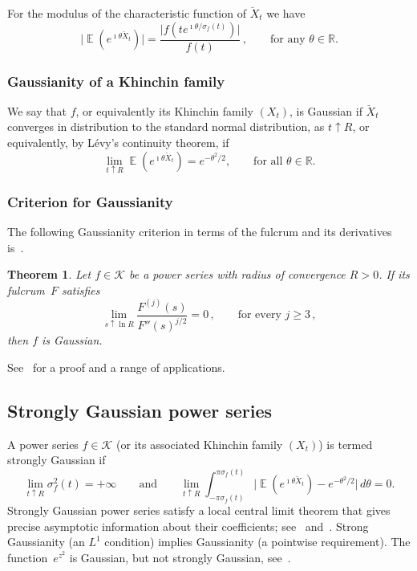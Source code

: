 \documentclass[12pt]{amsart}
\newtheorem{theoremL}{Theorem}
\theoremstyle{definition}
\DeclareMathOperator{\E}{\mathbb{E}}
\begin{document}
For the modulus of the characteristic function of $\breve{X}_t$ we have
\[
\big|\E(e^{\imath \theta \breve{X}_t})\big| = \frac{\big|f(t e^{\imath\theta/\sigma_f(t)})\big|}{f(t)}\,, \qquad \text{for any } \theta\in\mathbb{R}.
\]


\subsubsection{Gaussianity of a Khinchin family}\label{subsubsec:Gaussianity}

We say that $f$, or equivalently its Khinchin
family $(X_t)$, is Gaussian if $\breve{X}_t$ converges in distribution to the standard normal distribution, as $t\uparrow R$, or equivalently, by L\'evy's continuity theorem, if
\[
\lim_{t\uparrow R} \E(e^{\imath \theta \breve{X}_t}) = e^{-\theta^2/2}, \qquad \text{for all } \theta\in\mathbb{R}.
\]


\subsubsection{Criterion for Gaussianity}\label{subsubsec:criterion}

The following Gaussianity criterion in terms of the
fulcrum and its derivatives is~\cite[Theorem~4.1]{MaciaGaussianity}.

\begin{theoremL}\label{thm:gaussianty criterion}
Let $f\in\mathcal{K}$ be a power series with radius of convergence $R>0$. If its
fulcrum~$F$ satisfies
\[
\lim_{s\uparrow \ln R} \frac{F^{(j)}(s)}{F''(s)^{j/2}} = 0\,, \qquad \text{for every } j\ge 3\,,
\]
then $f$ is Gaussian.
\end{theoremL}

See~\cite{MaciaGaussianity} for a proof and a range of applications.


\subsection{Strongly Gaussian power series}\label{subsec:stronglyGaussian}

A power series $f\in\mathcal{K}$ (or its associated
Khinchin family $(X_t)$) is termed strongly Gaussian if
\[
\lim_{t\uparrow R} \sigma_f^2(t) = +\infty \qquad \text{and} \qquad \lim_{t\uparrow R} \int_{-\pi\sigma_f(t)}^{\pi\sigma_f(t)} \big|\E(e^{\imath \theta\breve{X}_t}) - e^{-\theta^2/2}\big|\, d\theta = 0.
\]
Strongly Gaussian power series satisfy a local central limit theorem that gives precise
asymptotic information about their coefficients; see~\cite{BaezDuarte, CFMK} and~\cite{Hayman}. Strong Gaussianity
(an $L^1$ condition) implies Gaussianity (a pointwise requirement). The function~$e^{z^2}$ is
Gaussian, but not strongly Gaussian, see~\cite[Remark~3.5]{CFMK}.
\end{document}
